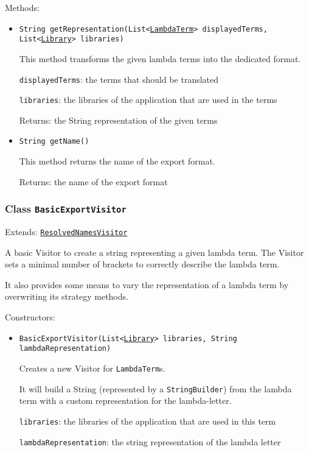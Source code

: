 Methods:
\begin{itemize}
\item \texttt{String getRepresentation(List<\hyperref[type:edu.kit.wavelength.client.model.term.LambdaTerm]{LambdaTerm}> displayedTerms, List<\hyperref[type:edu.kit.wavelength.client.model.library.Library]{Library}> libraries)}

This method transforms the given lambda terms into the dedicated format.

\texttt{displayedTerms}: the terms that should be translated

\texttt{libraries}: the libraries of the application that are used in the terms

Returns: the String representation of the given terms

\item \texttt{String getName()}

This method returns the name of the export format.

Returns: the name of the export format

\end{itemize}

\subsubsection{Class \texttt{BasicExportVisitor}}
\label{type:edu.kit.wavelength.client.view.export.BasicExportVisitor}
Extends: \texttt{\hyperref[type:edu.kit.wavelength.client.model.term.ResolvedNamesVisitor]{ResolvedNamesVisitor}}

A basic Visitor to create a string representing a given lambda term. The
 Visitor sets a minimal number of brackets to correctly describe the lambda
 term.
 
 It also provides some means to vary the representation of a lambda term by
 overwriting its strategy methods.

Constructors:
\begin{itemize}
\item \texttt{BasicExportVisitor(List<\hyperref[type:edu.kit.wavelength.client.model.library.Library]{Library}> libraries, String lambdaRepresentation)}

Creates a new Visitor for \texttt{LambdaTerm}s.
 
 It will build a String (represented by a \texttt{StringBuilder}) from the
 lambda term with a custom representation for the lambda-letter.

\texttt{libraries}: the libraries of the application that are used in this term

\texttt{lambdaRepresentation}: the string representation of the lambda letter

\end{itemize}

